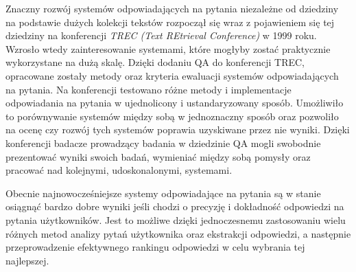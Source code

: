 \documentclass[a4paper, twoside, 12pt]{report}
\begin{document}
            Znaczny rozwój systemów odpowiadających na pytania niezależne od dziedziny na podstawie dużych kolekcji
            tekstów rozpoczął się wraz z pojawieniem się tej dziedziny na konferencji \emph{TREC (Text REtrieval Conference)}
            w 1999 roku.
            Wzrosło wtedy zainteresowanie systemami, które mogłyby zostać praktycznie wykorzystane na dużą skalę. Dzięki
            dodaniu QA do konferencji TREC, opracowane zostały metody oraz kryteria ewaluacji systemów odpowiadających
            na pytania. Na konferencji testowano różne metody i implementacje odpowiadania na pytania w ujednolicony i
            ustandaryzowany sposób. Umożliwiło to porównywanie systemów między sobą w jednoznaczny sposób oraz pozwoliło na ocenę
            czy rozwój tych systemów poprawia uzyskiwane przez nie wyniki. Dzięki konferencji badacze prowadzący badania
            w dziedzinie QA mogli swobodnie prezentować wyniki swoich badań, wymieniać między sobą pomysły oraz pracować
            nad kolejnymi, udoskonalonymi, systemami.

            Obecnie najnowocześniejsze systemy odpowiadające na pytania są w stanie osiągnąć bardzo dobre wyniki jeśli
            chodzi o precyzję i dokładność odpowiedzi na pytania użytkowników. Jest to możliwe dzięki jednoczesnemu zastosowaniu
            wielu różnych metod analizy pytań użytkownika oraz ekstrakcji odpowiedzi, a następnie przeprowadzenie efektywnego
            rankingu odpowiedzi w celu wybrania tej najlepszej.
\end{document}
